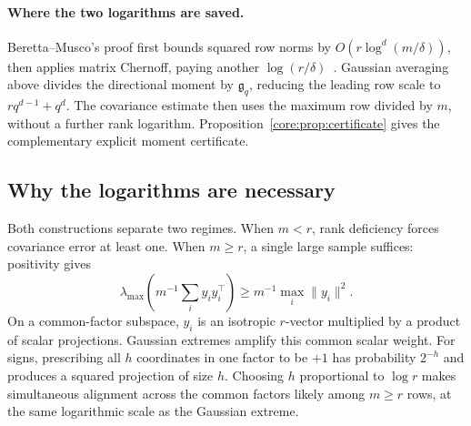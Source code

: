 \documentclass[11pt,a4paper]{article}
\theoremstyle{definition}\newtheorem{definition}[theorem]{Definition}
\theoremstyle{remark}\newtheorem{remark}[theorem]{Remark}
\numberwithin{equation}{section}
\newcommand{\gmom}{\mathfrak g}
\newcommand{\norm}[1]{\lVert#1\rVert}\newcommand{\ip}[2]{\langle#1,#2\rangle}
\begin{document}
\paragraph{Where the two logarithms are saved.}
Beretta--Musco's proof first bounds squared row norms by
$O(r\log^d(m/\delta))$, then applies matrix Chernoff, paying another
$\log(r/\delta)$~\cite[Section~2]{BM2026}. Gaussian averaging above
divides the directional moment by $\gmom_q$, reducing the leading
row scale to $r q^{d-1}+q^d$. The covariance estimate then uses the
maximum row divided by $m$, without a further rank logarithm.
Proposition~\ref{core:prop:certificate} gives the complementary
explicit moment certificate.

\subsection{Why the logarithms are necessary}
\label{core:sec:necessity}
Both constructions separate two regimes. When $m<r$, rank deficiency
forces covariance error at least one. When $m\ge r$, a single large
sample suffices: positivity gives
\[
 \lambda_{\max}\!\left(m^{-1}\sum_i y_iy_i^\top\right)
 \ge m^{-1}\max_i\norm{y_i}^2.
\]
On a common-factor subspace, $y_i$ is an isotropic $r$-vector multiplied
by a product of scalar projections. Gaussian extremes amplify this
common scalar weight. For signs, prescribing all $h$ coordinates in one
factor to be $+1$ has probability $2^{-h}$ and produces a squared
projection of size $h$. Choosing $h$ proportional to $\log r$ makes
simultaneous alignment across the common factors likely among $m\ge r$
rows, at the same logarithmic scale as the Gaussian extreme.
\end{document}
